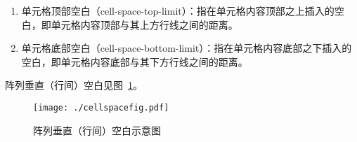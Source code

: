 \documentclass[dvipsnames]{article}%
\begin{document}
\begin{enumerate}
\begin{enumerate}
\begin{enumerate}
    \begin{enumerate}
    \item 单元格顶部空白（cell-space-top-limit）：指在单元格内容顶部之上插入的空白，即单元格内容顶部与其上方行线之间的距离。
    \item 单元格底部空白（cell-space-bottom-limit）：指在单元格内容底部之下插入的空白，即单元格内容底部与其下方行线之间的距离。
    \end{enumerate}
  阵列垂直（行间）空白见图~\ref{fig:阵列垂直（行间）空白示意图}。
  \end{enumerate}

\begin{figure}[htbp]
  \centering
  \texttt{[image: ./cellspacefig.pdf]}
  \caption{阵列垂直（行间）空白示意图}
  \label{fig:阵列垂直（行间）空白示意图}
\end{figure}


\end{enumerate}
\end{enumerate}
\end{document}
